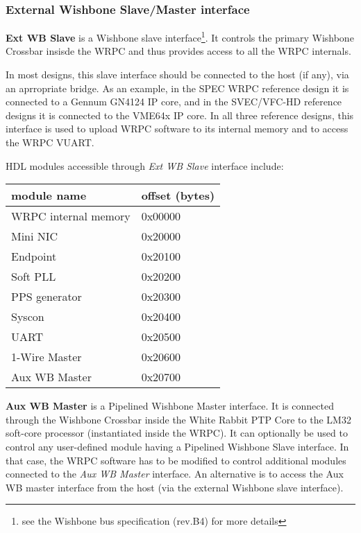 \subsubsection{External Wishbone Slave/Master interface}
\label{sec:wrpc_wb}

{\bf Ext WB Slave} is a Wishbone slave interface\footnote{see the Wishbone bus specification (rev.B4)
for more details}. It controls the primary Wishbone Crossbar insisde the WRPC and thus provides
access to all the WRPC internals.

In most designs, this slave interface should be connected to the host (if any), via an aprropriate
bridge. As an example, in the SPEC WRPC reference design it is connected to a Gennum GN4124 IP core,
and in the SVEC/VFC-HD reference designs it is connected to the VME64x IP core.  In all three
reference designs, this interface is used to upload WRPC software to its internal memory and to
access the WRPC VUART.

HDL modules accessible through \emph{Ext WB Slave} interface include:
\begin{center}
  \begin{tabular}{|l|l|}
    \hline {\bf module name} & {\bf offset (bytes)}\\
    \hline
    WRPC internal memory & 0x00000\\
                Mini NIC & 0x20000\\
                Endpoint & 0x20100\\
                Soft PLL & 0x20200\\
           PPS generator & 0x20300\\
                  Syscon & 0x20400\\
                    UART & 0x20500\\
           1-Wire Master & 0x20600\\
           Aux WB Master & 0x20700\\
    \hline
  \end{tabular}
\end{center}

{\bf Aux WB Master} is a Pipelined Wishbone Master interface. It is connected through the Wishbone
Crossbar inside the White Rabbit PTP Core to the LM32 soft-core processor (instantiated inside the
WRPC). It can optionally be used to control any user-defined module having a Pipelined Wishbone
Slave interface. In that case, the WRPC software has to be modified to control additional modules
connected to the \emph{Aux WB Master} interface. An alternative is to access the Aux WB master
interface from the host (via the external Wishbone slave interface).

